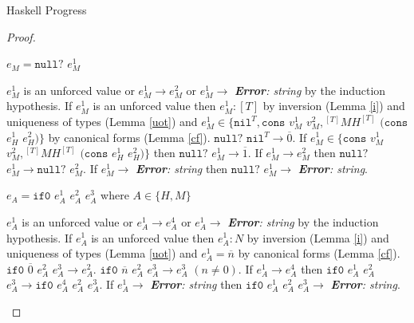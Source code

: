 \begin{theorem}{Haskell Progress}
\begin{proof}
\begin{case}
\end{case}


\begin{case}

$e_{M}=\mathtt{null?}$ $e_{M}^{1}$

$e_{M}^{1}$ is an unforced value or $e_{M}^{1}\rightarrow e_{M}^{2}$ or $e_{M}^{1}\rightarrow$ \emph{\textbf{Error}: string} by the induction hypothesis.  If $e_{M}^{1}$ is an unforced value then $e_{M}^{1}:[T]$ by inversion (Lemma \ref{i}) and uniqueness of types (Lemma \ref{uot}) and $e_{M}^{1}\in\lbrace\mathtt{nil}^{T},\mathtt{cons}$ $v_{M}^{1}$ $v_{M}^{2},{^{[T]}M}H^{[T]}$ $(\mathtt{cons}$ $e_{H}^{1}$ $e_{H}^{2})\rbrace$ by canonical forms (Lemma \ref{cf}).  $\mathtt{null?}$ $\mathtt{nil}^{T}\rightarrow\overline{0}$.  If $e_{M}^{1}\in\lbrace\mathtt{cons}$ $v_{M}^{1}$ $v_{M}^{2},{^{[T]}M}H^{[T]}$ $(\mathtt{cons}$ $e_{H}^{1}$ $e_{H}^{2})\rbrace$ then $\mathtt{null?}$ $e_{M}^{1}\rightarrow\overline{1}$.  If $e_{M}^{1}\rightarrow e_{M}^{2}$ then $\mathtt{null?}$ $e_{M}^{1}\rightarrow\mathtt{null?}$ $e_{M}^{2}$.  If $e_{M}^{1}\rightarrow$ \emph{\textbf{Error}: string} then $\mathtt{null?}$ $e_{M}^{1}\rightarrow$ \emph{\textbf{Error}: string}.

\end{case}


\begin{case}

$e_{A}=\mathtt{if0}$ $e_{A}^{1}$ $e_{A}^{2}$ $e_{A}^{3}$ where $A\in\lbrace H,M\rbrace$

$e_{A}^{1}$ is an unforced value or $e_{A}^{1}\rightarrow e_{A}^{4}$ or $e_{A}^{1}\rightarrow$ \emph{\textbf{Error}: string} by the induction hypothesis.  If $e_{A}^{1}$ is an unforced value then $e_{A}^{1}:N$ by inversion (Lemma \ref{i}) and uniqueness of types (Lemma \ref{uot}) and $e_{A}^{1}=\overline{n}$ by canonical forms (Lemma \ref{cf}).  $\mathtt{if0}$ $\overline{0}$ $e_{A}^{2}$ $e_{A}^{3}\rightarrow e_{A}^{2}$.  $\mathtt{if0}$ $\overline{n}$ $e_{A}^{2}$ $e_{A}^{3}\rightarrow e_{A}^{3}$ $(n\neq 0)$.  If $e_{A}^{1}\rightarrow e_{A}^{4}$ then $\mathtt{if0}$ $e_{A}^{1}$ $e_{A}^{2}$ $e_{A}^{3}\rightarrow \mathtt{if0}$ $e_{A}^{4}$ $e_{A}^{2}$ $e_{A}^{3}$.  If $e_{A}^{1}\rightarrow$ \emph{\textbf{Error}: string} then $\mathtt{if0}$ $e_{A}^{1}$ $e_{A}^{2}$ $e_{A}^{3}\rightarrow$ \emph{\textbf{Error}: string}.

\end{case}


\end{proof}
\end{theorem}
